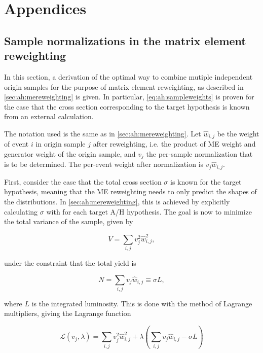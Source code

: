 \chapter{Appendices}

\section{Sample normalizations in the matrix element reweighting}
\label{app:mereweighting}
In this section, a derivation of the optimal way to combine mutiple independent origin samples for the purpose of matrix element reweighting, as described in \cref{sec:ah:mereweighting} is given. In particular, \cref{eq:ah:sampleweights} is proven for the case that the cross section corresponding to the target hypothesis is known from an external calculation.

The notation used is the same as in \cref{sec:ah:mereweighting}. Let $\hat{w}_{i,j}$ be the weight of event $i$ in origin sample $j$ after reweighting, i.e. the product of ME weight and generator weight of the origin sample, and $v_j$ the per-sample normalization that is to be determined. The per-event weight after normalization is $v_j \hat{w}_{i,j}$. 

First, consider the case that the total cross section $\sigma$ is known for the target hypothesis, meaning that the ME reweighting needs to only predict the shapes of the distributions. In \cref{sec:ah:mereweighting}, this is achieved by explicitly calculating $\sigma$ with \amcatnlo for each target A/H hypothesis. The goal is now to minimize the total variance of the sample, given by

\begin{equation}
    V = \sum_{i,j} v_j^2 \hat{w}_{i,j}^2 ,
\end{equation}

\noindent under the constraint that the total yield is

\begin{equation}
\label{eq:app:mecontstraint}
    N = \sum_{i,j} v_j \hat{w}_{i,j} \equiv \sigma L ,
\end{equation}

\noindent where $L$ is the integrated luminosity. This is done with the method of Lagrange multipliers, giving the Lagrange function

\begin{equation}
    \mathcal{L} (v_j, \lambda) = \sum_{i,j} v_j^2 \hat{w}_{i,j}^2 + \lambda \left( \sum_{i,j} v_j \hat{w}_{i,j} - \sigma L \right)
\end{equation}


